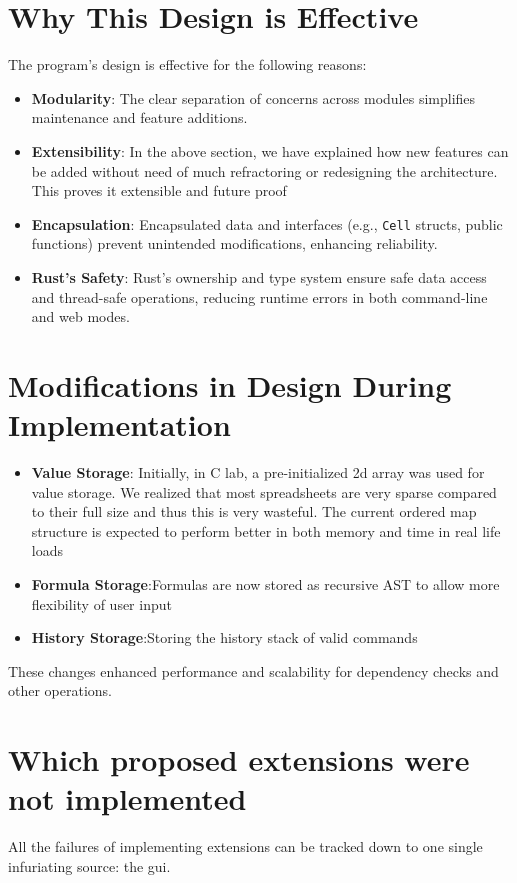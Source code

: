 \documentclass[12pt]{article}
\begin{document}
\begin{itemize}
\begin{itemize}
\end{itemize}

\section{Why This Design is Effective}
The program's design is effective for the following reasons:
\begin{itemize}
\item \textbf{Modularity}: The clear separation of concerns across modules  simplifies maintenance and feature
additions.
\item \textbf{Extensibility}: In the above section, we have explained how new features can be added without need of much refractoring or redesigning the architecture. This proves it extensible and future proof
\item \textbf{Encapsulation}: Encapsulated data and interfaces (e.g., \texttt{Cell} structs, public functions) prevent unintended modifications, enhancing reliability.
\item \textbf{Rust's Safety}: Rust's ownership and type system ensure safe data access and thread-safe operations, reducing runtime errors in both command-line and web
modes.
\end{itemize}

\section{Modifications in Design During Implementation}

\begin{itemize}
\item \textbf{Value Storage}: Initially, in C lab, a pre-initialized 2d array was used for value storage. We realized that most spreadsheets are very sparse compared to their full size and thus this is very wasteful. The current ordered map structure is expected to perform better in both memory and time in real life loads
\item \textbf{Formula Storage}:Formulas are now stored as recursive AST to allow more flexibility of user input
\item \textbf{History Storage}:Storing the history stack of valid commands \end{itemize}

These changes enhanced performance and scalability for dependency checks and other
operations.

\section{Which proposed extensions were not implemented}
All the failures of implementing extensions can be tracked down to one single infuriating source: the gui.


\end{itemize}
\end{document}

